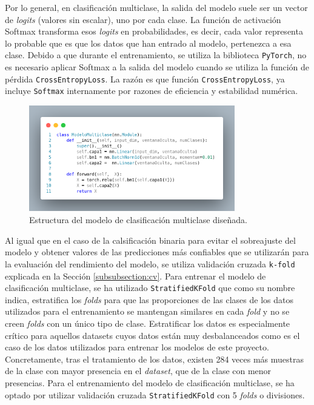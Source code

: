Por lo general, en clasificación multiclase, la salida del modelo suele ser un vector de \textit{logits} (valores sin escalar), uno por cada clase. La función de activación Softmax transforma esos \textit{logits} en probabilidades, es decir, cada valor representa lo probable que es que los datos que han entrado al modelo, pertenezca a esa clase. Debido a que durante el entrenamiento, se utiliza la biblioteca \texttt{PyTorch}, no es necesario aplicar Softmax a la salida del modelo cuando se utiliza la función de pérdida \texttt{CrossEntropyLoss}. La razón es que función \texttt{CrossEntropyLoss}, ya incluye \texttt{Softmax} internamente por razones de eficiencia y estabilidad numérica.

\begin{figure}[H]
    \centering
    \includegraphics[width=0.8\textwidth]{./img/modelo/codigo/modeloMUL.png}
    \caption{Estructura del modelo de clasificación multiclase diseñada.}
    \label{fig:modMUL}
\end{figure}

Al igual que en el caso de la calsificación binaria para evitar el sobreajuste del modelo y obtener valores de las predicciones más confiables que se utilizarán para la evaluación del rendimiento del modelo, se utiliza validación cruzada \texttt{k-fold} explicada en la Sección \ref{subsubsection:cv}.%
 Para entrenar el modelo de clasificación multiclase, se ha utilizado \texttt{StratifiedKFold} que como su nombre indica, estratifica los \textit{folds} para que las proporciones de las clases de los datos utilizados para el entrenamiento se mantengan similares en cada \textit{fold} y no se creen \textit{folds} con un único tipo de clase. Estratificar los datos es especialmente crítico para aquellos datasets cuyos datos están muy desbalanceados como es el caso de los datos utilizados para entrenar los modelos de este proyecto. Concretamente, tras el tratamiento de los datos, existen 284 veces más muestras de la clase con mayor presencia en el \textit{dataset}, que de la clase con menor presencias. Para el entrenamiento del modelo de clasificación multiclase, se ha optado por utilizar validación cruzada \texttt{StratifiedKFold} con 5 \textit{folds} o divisiones.

